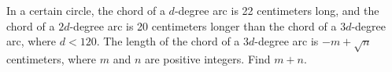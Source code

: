 In a certain circle, the chord of a $d$-degree arc is 22 centimeters long, and the chord of a $2d$-degree arc is 20 centimeters longer than the chord of a $3d$-degree arc, where $d<120.$  The length of the chord of a $3d$-degree arc is $-m+\sqrt{n}$ centimeters, where $m$ and $n$ are positive integers.  Find $m+n.$